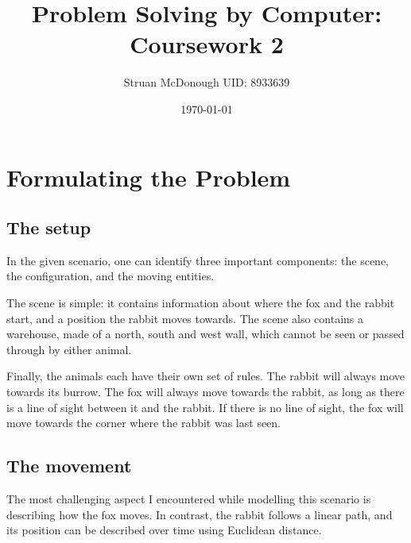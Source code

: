\documentclass[11pt]{article}
\begin{document}

\title{Problem Solving by Computer: Coursework 2}      %
\author{Struan McDonough UID: 8933639}      %
\date{\today}
\maketitle

\section{Formulating the Problem}

\subsection{The setup}
In the given scenario, one can identify three important components: the scene, the configuration, and the moving entities.

The scene is simple: it contains information about where the fox and the rabbit start, and a position the rabbit moves towards. The scene also contains a warehouse, made of a north, south and west wall, which cannot be seen or passed through by either animal.

Finally, the animals each have their own set of rules. The rabbit will always move towards its burrow. The fox will always move towards the rabbit, as long as there is a line of sight between it and the rabbit. If there is no line of sight, the fox will move towards the corner where the rabbit was last seen.

\subsection{The movement}
The most challenging aspect I encountered while modelling this scenario is describing how the fox moves. In contrast, the rabbit follows a linear path, and its position can be described over time using Euclidean distance.
\end{document}
